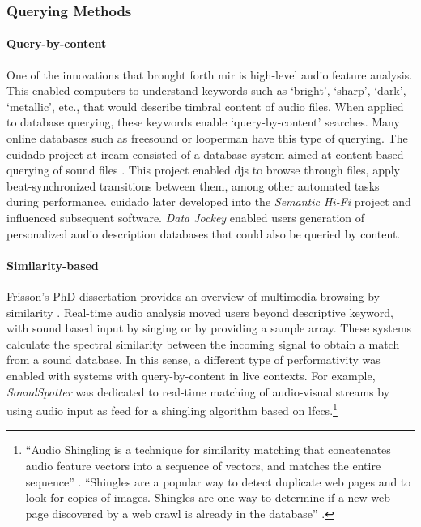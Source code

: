 \subsubsection{Querying Methods}
{
	\paragraph{Query-by-content}
	One of the innovations that brought forth \gls{mir} is high-level audio feature analysis. This enabled computers to understand keywords such as `bright', `sharp', `dark', `metallic', etc., that would describe timbral content of audio files. When applied to database querying, these keywords enable `query-by-content' searches. Many online databases such as \gls{freesound} or \gls{looperman} have this type of querying. The \gls{cuidado} project at \gls{ircam} consisted of a database system aimed at content based querying of sound files \parencite{DBLP:conf/ismir/VinetHP02, DBLP:conf/icmc/VinetHP02, DBLP:conf/icmc/Vinet05}. This project enabled \glspl{dj} to browse through files, apply beat-synchronized transitions between them, among other automated tasks during performance. \gls{cuidado} later developed into the \textit{Semantic Hi-Fi} project and influenced subsequent software. \textit{Data Jockey} \parencite{icmc/bbp2372.2007.117} enabled users generation of personalized audio description databases that could also be queried by content.

	\paragraph{Similarity-based}
	Frisson's PhD dissertation provides an overview of multimedia browsing by similarity \parencite{Frisson2015}. Real-time audio analysis moved users beyond descriptive keyword, with sound based input by singing or by providing a sample array. These systems calculate the spectral similarity between the incoming signal to obtain a match from a sound database. In this sense, a different type of performativity was enabled with systems with query-by-content in live contexts. For example, \textit{SoundSpotter} \parencite{DBLP:conf/icmc/CaseyG07} was dedicated to real-time matching of audio-visual streams by using audio input as feed for a shingling algorithm based on \glspl{lfcc}.\footnote{``Audio Shingling is a technique for similarity matching that concatenates audio feature vectors into a sequence of vectors, and matches the entire sequence'' \parencite{DBLP:conf/icmc/CaseyG07}. ``Shingles are a popular way to detect duplicate web pages and to look for copies of images. Shingles are one way to determine if a new web page discovered by a web crawl is already in the database'' \parencite{DBLP:conf/ismir/CaseyS06}.}

}
